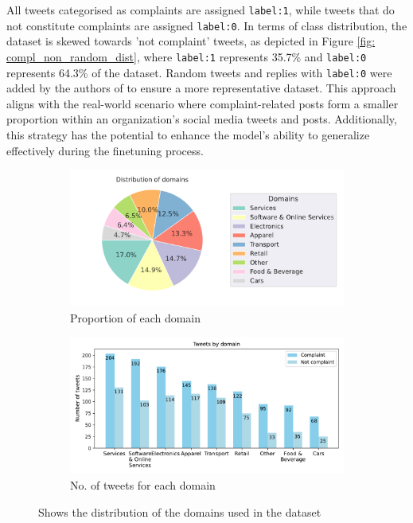 All tweets categorised as complaints are assigned \texttt{label:1}, while tweets that do not constitute complaints are assigned \texttt{label:0}. In terms of class distribution, the dataset is skewed towards 'not complaint' tweets, as depicted in Figure \ref{fig: compl_non_random_dist}, where \texttt{label:1} represents 35.7\% and \texttt{label:0} represents 64.3\% of the dataset. Random tweets and replies with \texttt{label:0} were added by the authors of \cite{preotiuc-pietro_automatically_2019} to ensure a more representative dataset. This approach aligns with the real-world scenario where complaint-related posts form a smaller proportion within an organization's social media tweets and posts. Additionally, this strategy has the potential to enhance the model's ability to generalize effectively during the finetuning process.\\

\begin{figure}[htbp]
    \centering
    \captionsetup{font=small}
    \begin{subfigure}{0.49\textwidth}
        \centering
        \includegraphics[width=\linewidth]{figures/domain_dist.pdf}
        \caption{Proportion of each domain}
        \label{fig: domain_dist_pct}
    \end{subfigure}
    \hfill
    \begin{subfigure}{0.49\textwidth}
        \centering
        \includegraphics[width=\linewidth]{figures/domain_counts_bar_norandom.pdf}
        \caption{No. of tweets for each domain}
        \label{fig: domain_dist_count}
    \end{subfigure}
    \caption{Shows the distribution of the domains used in the dataset}
    \label{fig: compl_main_dist}
\end{figure}

